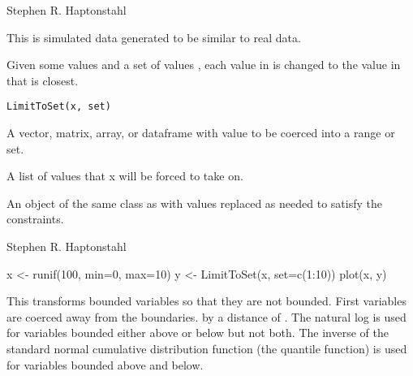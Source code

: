 \documentclass[a4paper]{book}
\begin{document}
%
\begin{Author}\relax
Stephen R. Haptonstahl 
\end{Author}
%
\begin{Source}\relax
This is simulated data generated to be similar to real data.
\end{Source}
%
\begin{Description}\relax
Given some values  and a set of values ,
each value in  is changed to the value in  that
is closest.
\end{Description}
%
\begin{Usage}
\begin{verbatim}
LimitToSet(x, set)
\end{verbatim}
\end{Usage}
%
\begin{Arguments}
\begin{ldescription}
\item[\code{x}] A vector, matrix, array, or dataframe with value to be coerced into a range or set.

\item[\code{set}] A list of values that x will be forced to take on.
\end{ldescription}
\end{Arguments}
%
\begin{Value}
An object of the same class as  with values replaced as needed to satisfy the constraints.
\end{Value}
%
\begin{Author}\relax
Stephen R. Haptonstahl 
\end{Author}
%
\begin{Examples}
\begin{ExampleCode}
x <- runif(100, min=0, max=10)
y <- LimitToSet(x, set=c(1:10))
plot(x, y)

\end{ExampleCode}
\end{Examples}
%
\begin{Description}\relax
This transforms bounded variables so that they are not bounded.
First variables are coerced away from the boundaries. by a distance of .
The natural log is used for variables bounded either above or below but not both.
The inverse of the standard normal cumulative distribution function 
(the quantile function) is used for variables bounded above and below.
\end{Description}
\end{document}
